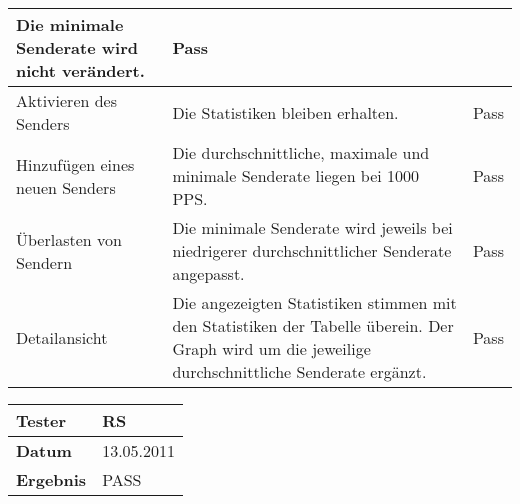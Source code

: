 \begin{table}[h]
\begin{center}
\begin{tabular}{|p{2.5cm}|p{7.55cm}|p{5cm}|}
                    Die minimale Senderate wird nicht verändert. &
                    Pass\\
                \hline
                    Aktivieren des Senders & Die
                    Statistiken bleiben erhalten. &
                    Pass\\
                \hline
                    Hinzufügen eines neuen Senders & Die durchschnittliche, maximale und minimale
                    Senderate liegen bei 1000 PPS. &
                    Pass\\
                \hline
                    Überlasten von Sendern & Die minimale Senderate wird jeweils bei niedrigerer
                    durchschnittlicher Senderate angepasst. &
                    Pass\\
                \hline
                    Detailansicht & Die angezeigten Statistiken
                    stimmen mit den Statistiken der Tabelle überein. Der Graph
                    wird um die jeweilige durchschnittliche Senderate ergänzt.
                    & Pass\\
                \hline
            \end{tabular}
            \begin{tabular}{|p{3.5cm}|p{11cm}|}
                \textbf{Tester} & RS\\
                \hline
                \textbf{Datum} & 13.05.2011\\
                \hline
                \textbf{Ergebnis} & PASS\\
                \hline
            \end{tabular}
        \end{center}
    \end{table}
    
